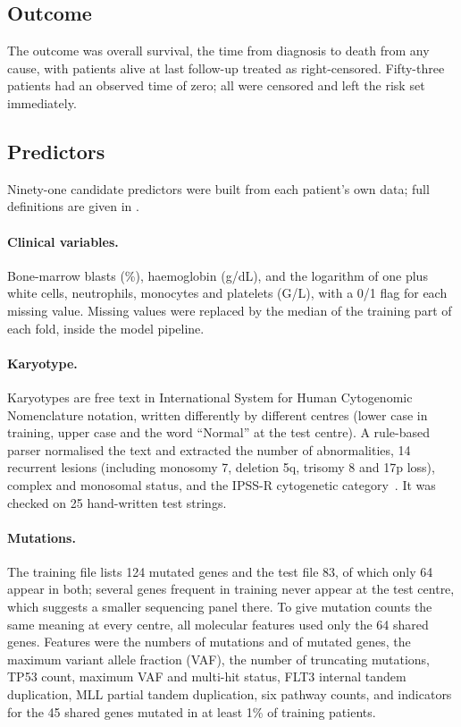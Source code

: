 \documentclass[10pt,letterpaper]{article}
\begin{document}
\subsection*{Outcome}
The outcome was overall survival, the time from diagnosis to death from any cause, with
patients alive at last follow-up treated as right-censored. Fifty-three patients had an
observed time of zero; all were censored and left the risk set immediately.

\subsection*{Predictors}
Ninety-one candidate predictors were built from each patient's own data; full definitions
are given in .

\paragraph*{Clinical variables.} Bone-marrow blasts (\%), haemoglobin (g/dL), and the
logarithm of one plus white cells, neutrophils, monocytes and platelets (G/L), with a 0/1
flag for each missing value. Missing values were replaced by the median of the training
part of each fold, inside the model pipeline.

\paragraph*{Karyotype.} Karyotypes are free text in International System for Human
Cytogenomic Nomenclature notation, written differently by different centres (lower case
in training, upper case and the word ``Normal'' at the test centre). A rule-based parser
normalised the text and extracted the number of abnormalities, 14 recurrent lesions
(including monosomy 7, deletion 5q, trisomy 8 and 17p loss), complex and monosomal status,
and the IPSS-R cytogenetic category~\cite{schanz2012}. It was checked on 25 hand-written
test strings.

\paragraph*{Mutations.} The training file lists 124 mutated genes and the test file 83, of
which only 64 appear in both; several genes frequent in training never appear at the test
centre, which suggests a smaller sequencing panel there. To give mutation counts the same
meaning at every centre, all molecular features used only the 64 shared genes. Features were
the numbers of mutations and of mutated genes, the maximum variant allele fraction (VAF),
the number of truncating mutations, TP53 count, maximum VAF and multi-hit status, FLT3
internal tandem duplication, MLL partial tandem duplication, six pathway counts, and
indicators for the 45 shared genes mutated in at least 1\% of training patients.
\end{document}
